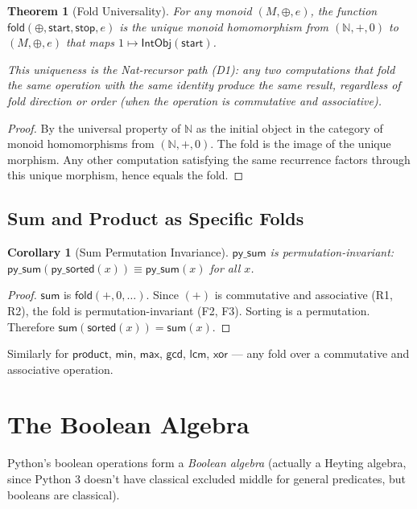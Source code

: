 \documentclass[11pt,a4paper]{report}
\theoremstyle{definition}
\theoremstyle{plain}
\newtheorem{theorem}[definition]{Theorem}
\newtheorem{corollary}[definition]{Corollary}
\newcommand{\Nat}{\mathbb{N}}
\newcommand{\fold}{\mathsf{fold}}
\begin{document}
\begin{theorem}[Fold Universality]
\label{thm:fold-universal}
For any monoid $(M, \oplus, e)$, the function
$\fold(\oplus, \mathsf{start}, \mathsf{stop}, e)$ is the
\emph{unique} monoid homomorphism from $(\Nat, +, 0)$ to $(M, \oplus, e)$
that maps $1 \mapsto \mathsf{IntObj}(\mathsf{start})$.

This uniqueness is the Nat-recursor path (D1): any two computations
that fold the same operation with the same identity produce the same
result, regardless of fold direction or order (when the operation
is commutative and associative).
\end{theorem}

\begin{proof}
By the universal property of $\Nat$ as the initial object in the
category of monoid homomorphisms from $(\Nat, +, 0)$.  The fold
is the image of the unique morphism.  Any other computation satisfying
the same recurrence factors through this unique morphism, hence
equals the fold.
\end{proof}

\subsection{Sum and Product as Specific Folds}

\begin{corollary}[Sum Permutation Invariance]
$\mathsf{py\_sum}$ is permutation-invariant:
$\mathsf{py\_sum}(\mathsf{py\_sorted}(x)) \equiv \mathsf{py\_sum}(x)$
for all $x$.
\end{corollary}

\begin{proof}
$\mathsf{sum}$ is $\fold(+, 0, \ldots)$.  Since $(+)$ is commutative
and associative (R1, R2), the fold is permutation-invariant (F2, F3).
Sorting is a permutation.  Therefore
$\mathsf{sum}(\mathsf{sorted}(x)) = \mathsf{sum}(x)$.
\end{proof}

Similarly for $\mathsf{product}$, $\mathsf{min}$, $\mathsf{max}$,
$\mathsf{gcd}$, $\mathsf{lcm}$, $\mathsf{xor}$ --- any fold over
a commutative and associative operation.


\section{The Boolean Algebra}

Python's boolean operations form a \emph{Boolean algebra} (actually
a Heyting algebra, since Python 3 doesn't have classical excluded
middle for general predicates, but booleans are classical).
\end{document}
